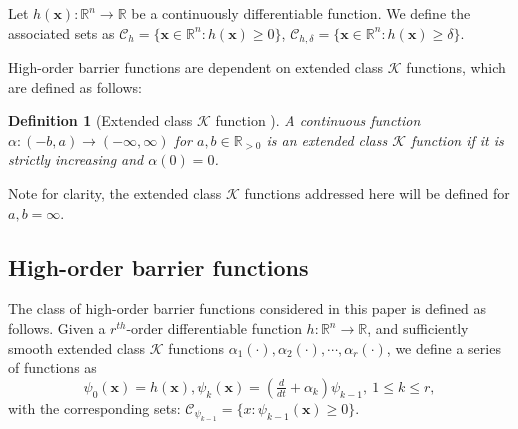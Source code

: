 \documentclass[letterpaper, 10 pt, journal, twoside]{IEEEtran}
\theoremstyle{plain}
\newtheorem{definition}{Definition}
\newcommand{\myvar}[1]{\bm{#1}}
\newcommand{\myvarfrak}[1]{\bm{\mathfrak{#1}}}
\newcommand{\myset}[1]{\mathscr{#1}}
\begin{document}
 
 Let $h(\myvar{x}): \mathbb{R}^n \to \mathbb{R}$ be a continuously differentiable function. We define the associated sets as $\myset{C}_{h} = \{\myvar{x} \in \mathbb{R}^n: h(\myvar{x}) \geq 0\}$, $\myset{C}_{h,\delta} = \{\myvar{x} \in \mathbb{R}^n: h(\myvar{x}) \geq \delta\}.$

{H}igh-order barrier functions are {dependent on} extended class $\mathcal{K}$ {functions}, which are defined as follows:
\begin{definition}[Extended class $\mathcal{K}$ function  \cite{Ames2017}] \label{def:extended class K}
A continuous function $\alpha:(-b,a) \to (-\infty,\infty)$ for $a,b \in \mathbb{R}_{>0}$ is an \textit{extended class $\mathcal{K}$ function} if it is strictly increasing and $\alpha(0) = 0$.
\end{definition} 
\noindent Note for clarity, the extended class $\mathcal{K}$ functions addressed here will be defined for $a,b = \infty$.

\subsection{High-order barrier functions}
The class of high-order barrier functions considered in this paper is defined as follows. {G}iven a $r^{th}$-order differentiable function $h: \mathbb{R}^n \to \mathbb{R}$, and  sufficiently smooth extended class $\mathcal{K}$ functions $\alpha_1(\cdot),\alpha_2(\cdot), \cdots,\alpha_{r}(\cdot)$, we define a series of functions as
 \begin{equation}\label{eq:a_series_psi}
 \psi_0(\myvar{x}) = h(\myvar{x}), \psi_k(\myvar{x}) = (\tfrac{d}{dt} + \alpha_{k} ) \psi_{k-1}, \  1\le k \le r,
 \end{equation}
{with the corresponding sets:} $ \myset{C}_{\psi_{k-1}}=\{ x:\psi_{k-1}(\myvar{x}) \ge 0 \} $.
\end{document}
